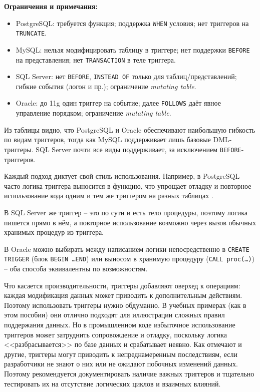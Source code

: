 \noindent\textbf{Ограничения и примечания:}

\begin{itemize}
    \item PostgreSQL: требуется функция; поддержка \texttt{WHEN} условия; нет триггеров на \texttt{TRUNCATE}.
    \item MySQL: нельзя модифицировать таблицу в триггере; нет поддержки \texttt{BEFORE} на представления; нет \texttt{TRANSACTION} в теле триггера.
    \item SQL Server: нет \texttt{BEFORE}, \texttt{INSTEAD OF} только для таблиц/представлений; гибкие события (логон и пр.); ограничение \textit{mutating table}.
    \item Oracle: до 11g один триггер на событие; далее \texttt{FOLLOWS} даёт явное управление порядком; ограничение \textit{mutating table}.
\end{itemize}

\vspace{0.5em}

Из таблицы видно, что PostgreSQL и Oracle обеспечивают наибольшую гибкость по видам триггеров, тогда как MySQL поддерживает лишь базовые DML-триггеры. SQL Server почти все виды поддерживает, за исключением \texttt{BEFORE}-триггеров.

Каждый подход диктует свой стиль использования. Например, в PostgreSQL часто логика триггера выносится в функцию, что упрощает отладку и повторное использование кода одним и тем же триггером на разных таблицах \autocite{Postgresqltrig}. 

В SQL Server же триггер – это по сути и есть тело процедуры, поэтому логика пишется прямо в нём, а повторное использование возможно через вызов обычных хранимых процедур из триггера. 

В Oracle можно выбирать между написанием логики непосредственно в \texttt{CREATE TRIGGER} (блок \texttt{BEGIN \ldots END}) или выносом в хранимую процедуру (\texttt{CALL proc(\ldots)}) \autocite{oracledbdoc7} – оба способа эквивалентны по возможностям.

Что касается производительности, триггеры добавляют оверхед к операциям: каждая модификация данных может приводить к дополнительным действиям. Поэтому использовать триггеры нужно обдуманно. В учебных примерах (как в этом пособии) они отлично подходят для иллюстрации сложных правил поддержания данных. Но в промышленном коде избыточное использование триггеров может затруднить сопровождение и отладку, поскольку логика <<разбрасывается>> по базе данных и срабатывает неявно. Как отмечают \autocite{Silberschatz} и другие, триггеры могут приводить к непреднамеренным последствиям, если разработчики не знают о них или не ожидают побочных изменений данных. Поэтому рекомендуется документировать наличие важных триггеров и тщательно тестировать их на отсутствие логических циклов и взаимных влияний.

